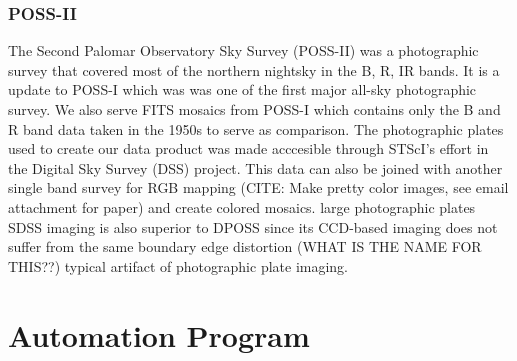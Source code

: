 \documentclass[5p]{elsarticle}
\begin{document}
	\subsubsection{POSS-II}
	The Second Palomar Observatory Sky Survey (POSS-II) was a photographic survey that covered most of the northern nightsky  in the B, R, IR bands.	It is a update to POSS-I which was 	was one of the first major all-sky photographic survey. We also serve FITS mosaics from POSS-I which contains only the B and R band data taken in the 1950s to serve as comparison.  The photographic plates used to create our data product was made acccesible through  STScI's effort in the Digital Sky Survey (DSS) project. This data can also be joined with another single band survey  for RGB mapping (CITE: Make pretty color images, see email attachment for paper) and create colored mosaics.
	large photographic plates 
	SDSS imaging is also superior to DPOSS since its CCD-based imaging does not suffer from the same  boundary edge distortion (WHAT IS THE NAME FOR THIS??) typical artifact of photographic plate imaging.
\section{Automation Program}
\end{document}
